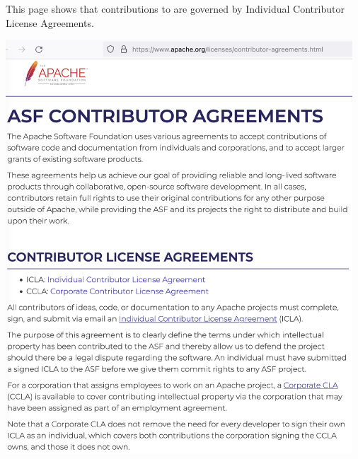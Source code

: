 
This page shows that contributions to \Asf are governed by Individual Contributor License Agreements.

\begin{center}
    \includegraphics[width=35em]{contributor-agreements}
\end{center}

\pagebreak
